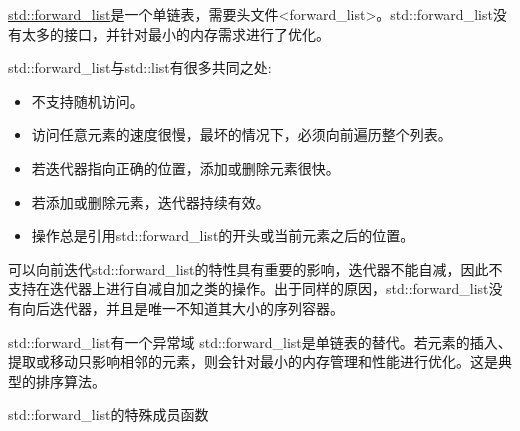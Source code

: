 

\href{http://en.cppreference.com/w/cpp/container/forward_list}{std::forward\_list}是一个单链表，需要头文件<forward\_list>。std::forward\_list没有太多的接口，并针对最小的内存需求进行了优化。

std::forward\_list与std::list有很多共同之处:

\begin{itemize}
\item 
不支持随机访问。

\item 
访问任意元素的速度很慢，最坏的情况下，必须向前遍历整个列表。

\item 
若迭代器指向正确的位置，添加或删除元素很快。

\item 
若添加或删除元素，迭代器持续有效。

\item 
操作总是引用std::forward\_list的开头或当前元素之后的位置。
\end{itemize}

可以向前迭代std::forward\_list的特性具有重要的影响，迭代器不能自减，因此不支持在迭代器上进行自减自加之类的操作。出于同样的原因，std::forward\_list没有向后迭代器，并且是唯一不知道其大小的序列容器。

\begin{myTip}{std::forward\_list有一个异常域}
std::forward\_list是单链表的替代。若元素的插入、提取或移动只影响相邻的元素，则会针对最小的内存管理和性能进行优化。这是典型的排序算法。
\end{myTip}

\begin{center}
std::forward\_list的特殊成员函数
\end{center}

